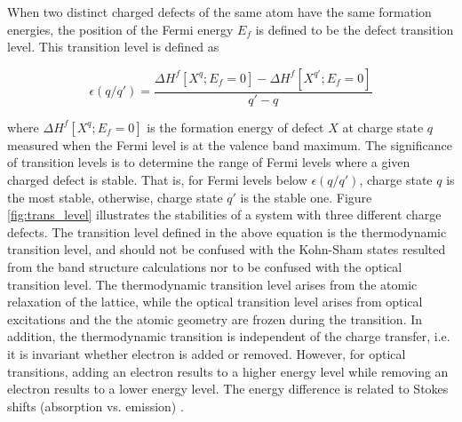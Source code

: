 When two distinct charged defects of the same atom have the same formation energies, the position of the Fermi energy $E_f$ is defined to be  the defect transition level. This transition level is defined as \citep{Janotti2007}

\begin{equation} \label{eq:trans_level}
	\epsilon(q/q')  = \frac{\Delta H^f[X^q;E_f=0] - \Delta H^f[X^{q'};E_f=0]}{q' - q}
\end{equation}

where $\Delta H^f[X^q;E_f=0] $ is the formation energy of defect $X$ at charge state $q$ measured when the Fermi level is at the valence band maximum.  The significance of transition levels is to determine the range of Fermi levels where a given charged defect is stable. That is, for Fermi levels below $\epsilon(q/q')$, charge state $q$ is the most stable, otherwise, charge state $q'$ is the stable one. Figure \ref{fig:trans_level} illustrates the stabilities of a system with three different charge defects. The transition level defined in the above equation is the thermodynamic transition level, and should not be confused with the Kohn-Sham states resulted from the band structure calculations nor to be confused with the optical transition level. The thermodynamic transition level arises from the atomic relaxation of the lattice, while the optical transition level arises from optical excitations and the the atomic geometry are frozen during the transition.  In addition, the thermodynamic transition is independent of the charge transfer, i.e. it is invariant whether electron is added or removed. However, for optical transitions, adding an electron results to a higher energy level   while removing  an electron results to a lower energy level. The energy difference is related to Stokes shifts (absorption vs. emission) \citep{Freysoldt2014}.

